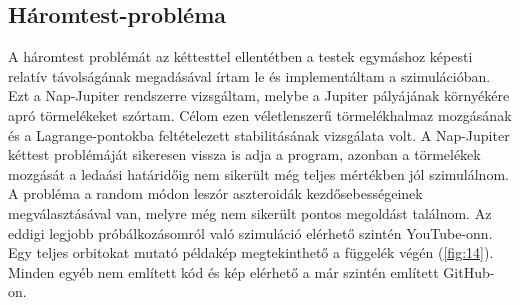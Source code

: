 \begin{multicols}{2}
\subsection{Háromtest-probléma} \label{sub:4.4}
A háromtest problémát az kéttesttel ellentétben a testek egymáshoz képesti relatív távolságának megadásával írtam le és implementáltam a szimulációban. Ezt a Nap-Jupiter rendszerre vizsgáltam, melybe a Jupiter pályájának környékére apró törmelékeket szórtam. Célom ezen véletlenszerű törmelékhalmaz mozgásának és a Lagrange-pontokba feltételezett stabilitásának vizsgálata volt. A Nap-Jupiter kéttest problémáját sikeresen vissza is adja a program, azonban a törmelékek mozgását a ledaási határidőig nem sikerült még teljes mértékben jól szimulálnom. A probléma a random módon leszór aszteroidák kezdősebességeinek megválasztásával van, melyre még nem sikerült pontos megoldást találnom. Az eddigi legjobb próbálkozásomról való szimuláció elérhető szintén YouTube-onn\cite{yt}. Egy teljes orbitokat mutató példakép megtekinthető a függelék végén (\ref{fig:14}). Minden egyéb nem említett kód és kép elérhető a már szintén említett GitHub-on\cite{github}.

\end{multicols}